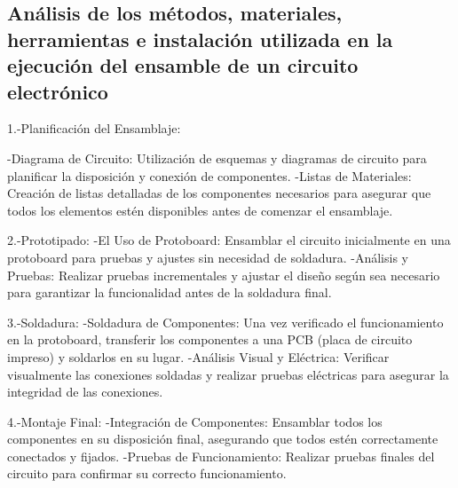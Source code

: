     \subsection{Análisis de los métodos, materiales, herramientas e instalación utilizada en la ejecución del ensamble de un circuito electrónico}
    1.-Planificación del Ensamblaje:
    
    -Diagrama de Circuito: Utilización de esquemas y diagramas de circuito para planificar la disposición y conexión de componentes.
    -Listas de Materiales: Creación de listas detalladas de los componentes necesarios para asegurar que todos los elementos estén disponibles antes de comenzar el ensamblaje.
    
    2.-Prototipado:
    -El Uso de Protoboard: Ensamblar el circuito inicialmente en una protoboard para pruebas y ajustes sin necesidad de soldadura.
    -Análisis y Pruebas: Realizar pruebas incrementales y ajustar el diseño según sea necesario para garantizar la funcionalidad antes de la soldadura final.
    
    3.-Soldadura:
    -Soldadura de Componentes: Una vez verificado el funcionamiento en la protoboard, transferir los componentes a una PCB (placa de circuito impreso) y soldarlos en su lugar.
    -Análisis Visual y Eléctrica: Verificar visualmente las conexiones soldadas y realizar pruebas eléctricas para asegurar la integridad de las conexiones.
    
    4.-Montaje Final:
    -Integración de Componentes: Ensamblar todos los componentes en su disposición final, asegurando que todos estén correctamente conectados y fijados.
    -Pruebas de Funcionamiento: Realizar pruebas finales del circuito  para confirmar su correcto funcionamiento.
